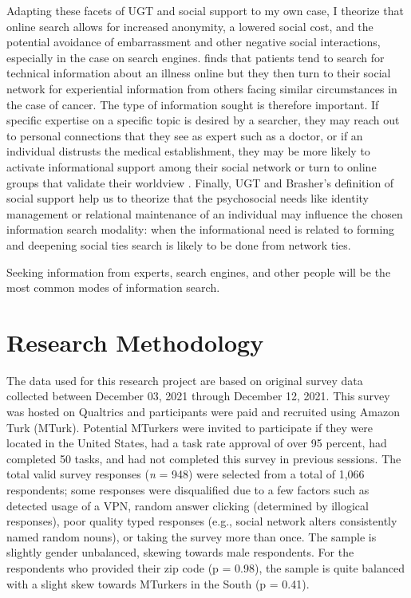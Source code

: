 Adapting these facets of UGT and social support to my own case, I theorize that
online search allows for increased anonymity, a lowered social cost, and the
potential avoidance of embarrassment and other negative social interactions,
especially in the case on search engines.
\citet{rainsCopingIllnessDigitally2018} finds that patients tend to search for
technical information about an illness online but they then turn to their social
network for experiential information from others facing similar circumstances in
the case of cancer. The type of information sought is therefore important. If
specific expertise on a specific topic is desired by a searcher, they may reach
out to personal connections that they see as expert such as a doctor, or if an
individual distrusts the medical establishment, they may be more likely to
activate informational support among their social network or turn to online
groups that validate their worldview \citep{bogersHowSocialAre2014}. Finally,
UGT and Brasher's definition of social support
\citeyearpar{brashersInformationSeekingAvoiding2002} help us to theorize that
the psychosocial needs like identity management or relational maintenance of an
individual may influence the chosen information search modality: when the
informational need is related to forming and deepening social ties search is
likely to be done from network ties.

\begin{hyp} \label{hyp:drgooglefriend}
Seeking information from experts, search engines, and other people
will be the most common modes of information search. 
\end{hyp}

\hypertarget{research-methodology}{\section{Research Methodology}\label{research-methodology}}

The data used for this research project are based on original survey data
collected between December 03, 2021 through December 12, 2021. This survey was
hosted on Qualtrics and participants were paid and recruited using Amazon Turk
(MTurk). Potential MTurkers were invited to participate if they were located in
the United States, had a task rate approval of over 95 percent, had completed 50
tasks, and had not completed this survey in previous sessions. The total valid
survey responses (\emph{n} = 948) were selected from a total of 1,066
respondents; some responses were disqualified due to a few factors such as
detected usage of a VPN, random answer clicking (determined by illogical
responses), poor quality typed responses (e.g., social network alters
consistently named random nouns), or taking the survey more than once. The
sample is slightly gender unbalanced, skewing towards male respondents. For the
respondents who provided their zip code (p = 0.98), the sample is quite balanced
with a slight skew towards MTurkers in the South (p = 0.41).

